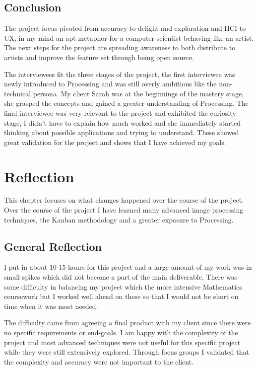 \documentclass[a4paper]{report}
\begin{document}
\section{Conclusion}
The project focus pivoted from accuracy to delight and exploration and HCI to UX, in my mind an apt metaphor for a computer scientist behaving like an artist. The next steps for the project are spreading awareness to both distribute to artists and improve the feature set through being open source.

The interviewees fit the three stages of the project, the first interviewee was newly introduced to Processing and was still overly ambitious like the non-technical persona. My client Sarah was at the beginnings of the mastery stage, she grasped the concepts and gained a greater understanding of Processing. The final interviewee was very relevant to the project and exhibited the curiosity stage, I didn't have to explain how much worked and she immediately started thinking about possible applications and trying to understand. These showed great validation for the project and shows that I have achieved my goals.  

\chapter{Reflection}
This chapter focuses on what changes happened over the course of the project. Over the course of the project I have learned many advanced image processing techniques, the Kanban methodology and a greater exposure to Processing. 

\section{General Reflection}
I put in about 10-15 hours for this project and a large amount of my work was in small spikes which did not become a part of the main deliverable. There was some difficulty in balancing my project which the more intensive Mathematics coursework but I worked well ahead on these so that I would not be short on time when it was most needed.

The difficulty came from agreeing a final product with my client since there were no specific requirements or end-goals. I am happy with the complexity of the project and most advanced techniques were not useful for this specific project while they were still extensively explored. Through focus groups I validated that the complexity and accuracy were not important to the client.
\end{document}
